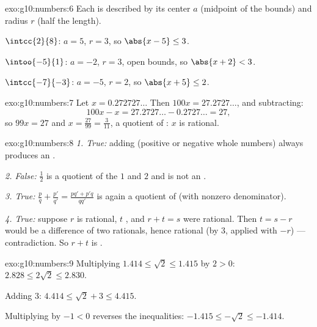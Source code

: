 \begin{solution}{exo:g10:numbers:6}
Each  is described by its center $a$ (midpoint of the bounds) and
radius $r$ (half the length).

$\intcc{2}{8}$: $a = 5$, $r = 3$, so $\abs{x - 5} \leq 3$.

$\intoo{-5}{1}$: $a = -2$, $r = 3$, open bounds, so $\abs{x + 2} < 3$.

$\intcc{-7}{-3}$: $a = -5$, $r = 2$, so $\abs{x + 5} \leq 2$.
\end{solution}

\begin{solution}{exo:g10:numbers:7}
Let $x = 0.272727\dots$ Then $100x = 27.2727\dots$, and subtracting:
\[
100x - x = 27.2727\dots - 0.2727\dots = 27,
\]
so $99x = 27$ and $x = \frac{27}{99} = \frac{3}{11}$, a quotient of
: $x$ is rational.
\end{solution}

\begin{solution}{exo:g10:numbers:8}
\emph{1. True:} adding  (positive or negative whole numbers)
always produces an .

\emph{2. False:} $\frac{1}{2}$ is a quotient of the  $1$ and $2$
and is not an .

\emph{3. True:} $\frac pq + \frac{p'}{q'} = \frac{pq' + p'q}{qq'}$ is
again a quotient of  (with nonzero denominator).

\emph{4. True:} suppose $r$ is rational, $t$ , and $r + t = s$
were rational. Then $t = s - r$ would be a difference of two rationals,
hence rational (by 3, applied with $-r$) --- contradiction. So $r + t$ is
.
\end{solution}

\begin{solution}{exo:g10:numbers:9}
Multiplying $1.414 \leq \sqrt2 \leq 1.415$ by $2 > 0$:
$2.828 \leq 2\sqrt2 \leq 2.830$.

Adding $3$: $4.414 \leq \sqrt2 + 3 \leq 4.415$.

Multiplying by $-1 < 0$ reverses the inequalities:
$-1.415 \leq -\sqrt2 \leq -1.414$.
\end{solution}

